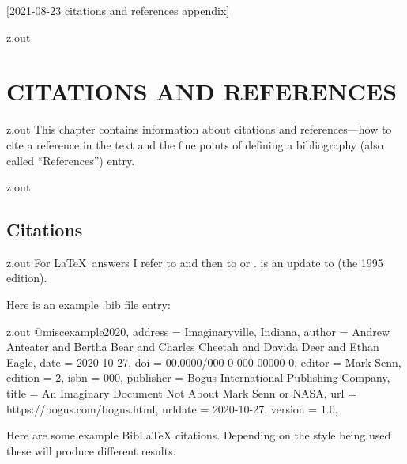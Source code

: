 [2021-08-23 citations and references appendix]

\begin{VerbatimOut}{z.out}
\chapter{CITATIONS AND REFERENCES}
\end{VerbatimOut}

\MyIO


\begin{VerbatimOut}{z.out}
This chapter contains information about citations
and references---how to cite a reference in the text
and the fine points of defining a bibliography
(also called ``References'')
entry.
\end{VerbatimOut}

\MyIO


\begin{VerbatimOut}{z.out}
\section{Citations}
\end{VerbatimOut}

\MyIO


\begin{VerbatimOut}{z.out}
For \LaTeX\ answers I refer to
\cite{lamport1994}
and then to
\cite{goossens1994}
or
\cite{kopka1999}.
\cite{kopka1999}
is an update to \cite{kopka1995} (the 1995 edition).
\end{VerbatimOut}

\MyIO


Here is an example .bib file entry:

\begin{VerbatimOut}{z.out}
@misc{example2020,
  address   = {Imaginaryville, Indiana},
  author    = {Andrew Anteater and Bertha Bear and Charles Cheetah and Davida Deer and Ethan Eagle},
  date      = {2020-10-27},
  doi       = {00.0000/000-0-000-00000-0},
  editor    = {Mark Senn},
  edition   = {2},
  isbn      = {{000}},
  publisher = {Bogus International Publishing Company},
  title     = {An Imaginary Document Not About {Mark Senn} or {NASA}},
  url       = {https://bogus.com/bogus.html},
  urldate   = {2020-10-27},
  version   = {1.0},
}
\end{VerbatimOut}

\MyIO


Here are some example BibLaTeX citations.
Depending on the style being used these will produce different results.

